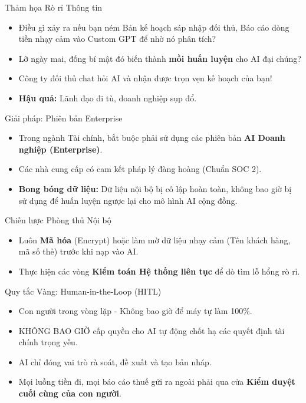 \documentclass[aspectratio=169,12pt]{beamer}
\begin{document}
\begin{frame}{Thảm họa Rò rỉ Thông tin}
    \begin{itemize}
        \item Điều gì xảy ra nếu bạn ném Bản kế hoạch sáp nhập đối thủ, Báo cáo dòng tiền nhạy cảm vào Custom GPT để nhờ nó phân tích?
        \item Lỡ ngày mai, đống bí mật đó biến thành \textbf{mồi huấn luyện} cho AI đại chúng?
        \item Công ty đối thủ chat hỏi AI và nhận được trọn vẹn kế hoạch của bạn!
        \item \textbf{Hậu quả:} Lãnh đạo đi tù, doanh nghiệp sụp đổ.
    \end{itemize}
\end{frame}

\begin{frame}{Giải pháp: Phiên bản Enterprise}
    \begin{itemize}
        \item Trong ngành Tài chính, bắt buộc phải sử dụng các phiên bản \textbf{AI Doanh nghiệp (Enterprise)}.
        \item Các nhà cung cấp có cam kết pháp lý đàng hoàng (Chuẩn SOC 2).
        \item \textbf{Bong bóng dữ liệu:} Dữ liệu nội bộ bị cô lập hoàn toàn, không bao giờ bị sử dụng để huấn luyện ngược lại cho mô hình AI cộng đồng.
    \end{itemize}
\end{frame}

\begin{frame}{Chiến lược Phòng thủ Nội bộ}
    \begin{itemize}
        \item Luôn \textbf{Mã hóa} (Encrypt) hoặc làm mờ dữ liệu nhạy cảm (Tên khách hàng, mã số thẻ) trước khi nạp vào AI.
        \item Thực hiện các vòng \textbf{Kiểm toán Hệ thống liên tục} để dò tìm lỗ hổng rò rỉ.
    \end{itemize}
\end{frame}

\begin{frame}{Quy tắc Vàng: Human-in-the-Loop (HITL)}
    \begin{itemize}
        \item Con người trong vòng lặp - Không bao giờ để máy tự làm 100\%.
        \item KHÔNG BAO GIỜ cấp quyền cho AI tự động chốt hạ các quyết định tài chính trọng yếu.
        \item AI chỉ đóng vai trò rà soát, đề xuất và tạo bản nháp.
        \item Mọi luồng tiền đi, mọi báo cáo thuế gửi ra ngoài phải qua cửa \textbf{Kiểm duyệt cuối cùng của con người}.
    \end{itemize}
\end{frame}
\end{document}
